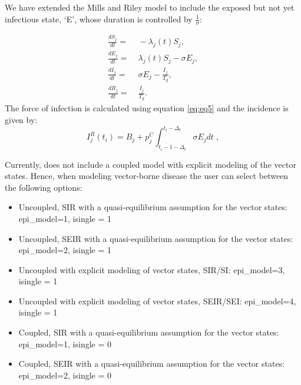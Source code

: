 \documentclass[a4paper]{article}
\begin{document}
We have extended the Mills and Riley model to include the exposed but not yet infectious state, `E', whose duration is controlled by $\frac{1}{\sigma}$:

\begin{align}
\frac{dS_j}{dt} =&\; - \lambda_j(t)S_j, \label{eq:eqnSEIRC1} \\
\frac{dE_j}{dt} =&\;  \lambda_j(t)S_j - \sigma{E_j}, \label{eq:eqnSEIRC2} \\
\frac{dI_j}{dt} =&\;  \sigma{E_j} - \frac{I_j}{T_g}, \label{eq:eqnSEIRC3} \\
\frac{dR_j}{dt} =&\; \frac{I_j}{T_g}. \label{eq:eqnSEIRC4}
\end{align}
The force of infection is calculated using equation \ref{eq:eq5} and the incidence is given by:
\begin{equation}
I_j^R(t_i) = B_j + p_j^C \int_{t_i-1-\Delta_t}^{t_i-\Delta_t} {\sigma E_j} dt\;,
\label{eq:IncSEIRC}
\end{equation}

Currently,  does not include a coupled model with explicit modeling of the vector states.  Hence, when modeling vector-borne disease the user can select between the following options:
\begin{itemize}
  \item Uncoupled, SIR with a quasi-equilibrium assumption for the vector states: epi\_model=1, isingle = 1

  \item Uncoupled, SEIR with a quasi-equilibrium assumption for the vector states: epi\_model=2, isingle = 1

  \item Uncoupled with explicit modeling of vector states, SIR/SI: epi\_model=3, isingle = 1

  \item Uncoupled with explicit modeling of vector states, SEIR/SEI: epi\_model=4, isingle = 1

  \item Coupled, SIR with a quasi-equilibrium assumption for the vector states: epi\_model=1, isingle = 0

  \item Coupled, SEIR with a quasi-equilibrium assumption for the vector states: epi\_model=2, isingle = 0
\end{itemize}
\end{document}
